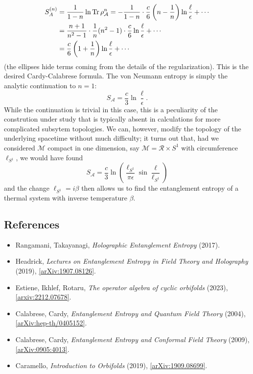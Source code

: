 \documentclass{report}
\begin{document}
\begin{align*}
	S^{(n)}_A &= \frac{1}{1-n}\ln \Tr \rho_\mathcal{A}^n 
		= - \frac{1}{1-n} \cdot \frac{c}{6}\left(n - \frac{1}{n}\right)\ln \frac{\ell}{\epsilon} + \cdots \\
		&= \frac{n+1}{n^2 - 1} \cdot \frac{1}{n}(n^2 - 1) \cdot \frac{c}{6}\ln \frac{\ell}{\epsilon} + \cdots\\
		&= \frac{c}{6}\left(1 + \frac{1}{n}\right) \ln \frac{\ell}{\epsilon} + \cdots
\end{align*}
(the ellipses hide terms coming from the details of the regularization). This is
the desired Cardy-Calabrese formula. The von Neumann entropy is simply the
analytic continuation to $ n=1 $:
\begin{equation*}
	S_\mathcal{A} = \frac{c}{3} \ln \frac{\ell}{\epsilon}.
\end{equation*}
While the continuation is trivial in this case, this is a peculiarity of the 
constrution under study that is typically absent in calculations for more 
complicated subsytem topologies. We can, however, modify the topology of the 
underlying spacetime without much difficulty; it turns out that, had we 
considered $ \mathcal{M} $ compact in one dimension, say $ \mathcal{M} = 
\mathcal{R} \times S^1$ with circumference $ \ell_{S^1} $, we would have found 
\begin{equation*}
	S_\mathcal{A}
		= \frac{c}{3} \ln \left(\frac{\ell_{S^1}}{\pi \epsilon} 
			\sin \frac{\ell}{\ell_{S^1}}\right)
\end{equation*}
and the change $ \ell_{S^1} = i\beta $ then allows us to find the entanglement 
entropy of a thermal system with inverse temperature $ \beta $.

\subsection*{References}
\begin{itemize}[nosep]
\item Rangamani, Takayanagi, \textit{Holographic Entanglement Entropy} (2017).
\item Headrick, \textit{Lectures on Entanglement Entropy in Field Theory and 
	Holography} (2019),
\href{https://arxiv.org/abs/1907.08126}{[arXiv:1907.08126]}.  
\item Estiene, Ikhlef, Rotaru, \textit{The operator algebra of cyclic orbifolds} (2023), 
	\href{https://arxiv.org/abs/2212.07678}{[arxiv:2212.07678]}.
\item Calabrese, Cardy, \textit{Entanglement Entropy and Quantum Field Theory} (2004),
	\href{https://arxiv.org/abs/hep-th/0405152}{[arXiv:hep-th/0405152]}.
\item Calabrese, Cardy, \textit{Entanglement Entropy and Conformal Field Theory} (2009),\\ 
	\href{https://arxiv.org/abs/0905.4013}{[arXiv:0905:4013]}.
\item Caramello, \textit{Introduction to Orbifolds} (2019),
	\href{https://arxiv.org/abs/1909.08699}{[arXiv:1909.08699]}.
\end{itemize}
\end{document}
